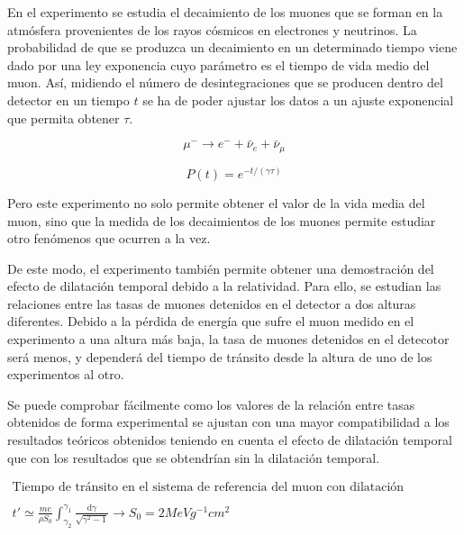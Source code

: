 \documentclass[11pt]{extarticle}
\begin{document}
					En el experimento se estudia el decaimiento de los muones que se forman en la atmósfera provenientes de los rayos cósmicos en electrones y neutrinos. La probabilidad de que se produzca un decaimiento en un determinado tiempo viene dado por una ley exponencia cuyo parámetro es el tiempo de vida medio del muon. Así, midiendo el número de desintegraciones que se producen dentro del detector en un tiempo $t$ se ha de poder ajustar los datos a un ajuste exponencial que permita obtener $\tau$.

						\begin{multicols}{2}
							\[
								\mu^- \rightarrow e^- + \bar{\nu}_e + \bar{\nu}_\mu
							\]

							\[
								P(t) = e^{-t/(\gamma \tau)}
							\]
						\end{multicols}

					Pero este experimento no solo permite obtener el valor de la vida media del muon, sino que la medida de los decaimientos de los muones permite estudiar otro fenómenos que ocurren a la vez.

					De este modo, el experimento también permite obtener una demostración del efecto de dilatación temporal debido a la relatividad. Para ello, se estudian las relaciones entre las tasas de muones detenidos en el detector a dos alturas diferentes. Debido a la pérdida de energía que sufre el muon medido en el experimento a una altura más baja, la tasa de muones detenidos en el detecotor será menos, y dependerá del tiempo de tránsito desde la altura de uno de los experimentos al otro. 

					Se puede comprobar fácilmente como los valores de la relación entre tasas obtenidos de forma experimental se ajustan con una mayor compatibilidad a los resultados teóricos obtenidos teniendo en cuenta el efecto de dilatación temporal que con los resultados que se obtendrían sin la dilatación temporal.

						\begin{equation*}
							\begin{matrix}
								\textrm{Tiempo de tránsito en el sistema de referencia del muon con dilatación temporal}\\ \\
								t' \simeq \frac{mc}{\rho S_0} \int^{\gamma_1}_{\gamma_2} \frac{\textrm{d}\gamma}{\sqrt{\gamma^2 - 1}} \rightarrow S_0 = 2 MeV g^{-1} cm^{2} 
							\end{matrix}
						\end{equation*}
\end{document}

